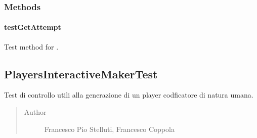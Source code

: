 \documentclass[letterpaper,10pt,italian,openany,oneside]{sphinxmanual}
\begin{document}
\subsubsection{Methods}
\label{\detokenize{test/it/unicam/cs/pa/mastermind/test/PlayersInteractiveBreakerTest:methods}}

\paragraph{testGetAttempt}
\label{\detokenize{test/it/unicam/cs/pa/mastermind/test/PlayersInteractiveBreakerTest:testgetattempt}}

\begin{fulllineitems}
\label{\detokenize{test/it/unicam/cs/pa/mastermind/test/PlayersInteractiveBreakerTest:it.unicam.cs.pa.mastermind.test.PlayersInteractiveBreakerTest.testGetAttempt()}}
Test method for .

\end{fulllineitems}



\subsection{PlayersInteractiveMakerTest}
\label{\detokenize{test/it/unicam/cs/pa/mastermind/test/PlayersInteractiveMakerTest:playersinteractivemakertest}}\label{\detokenize{test/it/unicam/cs/pa/mastermind/test/PlayersInteractiveMakerTest::doc}}

\begin{fulllineitems}
\label{\detokenize{test/it/unicam/cs/pa/mastermind/test/PlayersInteractiveMakerTest:it.unicam.cs.pa.mastermind.test.PlayersInteractiveMakerTest}}
Test di controllo utili alla generazione di un player codficatore di natura umana.
\begin{quote}\begin{description}
\item[{Author}] \leavevmode
Francesco Pio Stelluti, Francesco Coppola

\end{description}\end{quote}

\end{fulllineitems}
\end{document}
